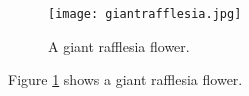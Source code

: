 \documentclass{article}
\begin{document}
	\begin{figure}
	\texttt{[image: giantrafflesia.jpg]}
		\caption{A giant rafflesia flower.}
		\label{fig:giantrafflesia}
	\end{figure}
    Figure \ref{fig:giantrafflesia} shows a giant rafflesia flower.
     
\end{document}
